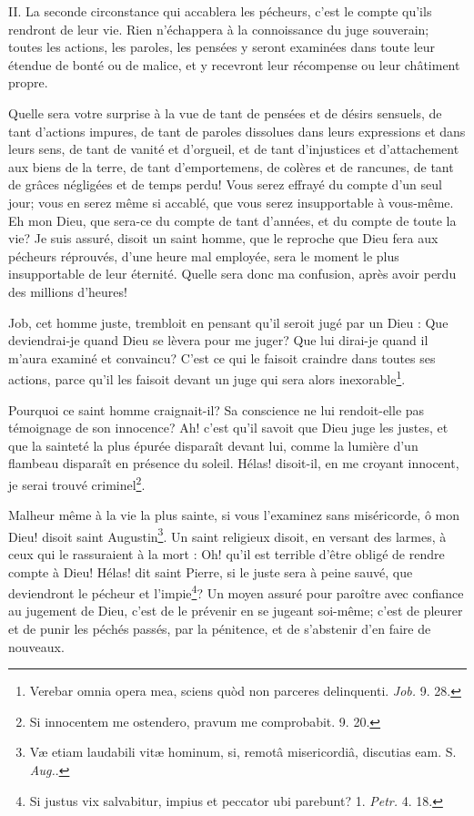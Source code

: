 \documentclass[instructions.tex]{subfiles}
\begin{document}
II. La seconde circonstance qui accablera les pécheurs, c'est le compte qu'ils rendront de leur vie. Rien n'échappera à la connoissance du juge souverain; toutes les actions, les paroles, les pensées y seront examinées dans toute leur étendue de bonté ou de malice, et y recevront leur récompense ou leur châtiment propre.
 
Quelle sera votre surprise à la vue de tant de pensées et de désirs sensuels, de tant d'actions impures, de tant de paroles dissolues dans leurs expressions et dans leurs sens, de tant de vanité et d'orgueil, et de tant d'injustices et d'attachement aux biens de la terre, de tant d'emportemens, de colères et de rancunes, de tant de grâces négligées et de temps perdu! Vous serez effrayé du compte d'un seul jour; vous en serez même si accablé, que vous serez insupportable à vous-même. Eh mon Dieu, que sera-ce du compte de tant d'années, et du compte de toute la vie? Je suis assuré, disoit un saint homme, que le reproche que Dieu fera aux pécheurs réprouvés, d'une heure mal employée, sera le moment le plus insupportable de leur éternité. Quelle sera donc ma confusion, après avoir perdu des millions d'heures!
 
Job, cet homme juste, trembloit en pensant qu'il seroit jugé par un Dieu : Que deviendrai-je quand Dieu se lèvera pour me juger? Que lui dirai-je quand il m'aura examiné et convaincu? C'est ce qui le faisoit craindre dans toutes ses actions, parce qu'il les faisoit devant un juge qui sera alors inexorable\footnote{Verebar omnia opera mea, sciens quòd non parceres delinquenti. \textit{Job.} 9. 28.}.
 
Pourquoi ce saint homme craignait-il? Sa conscience ne lui rendoit-elle pas témoignage de son innocence? Ah! c'est qu'il savoit que Dieu juge les justes, et que la sainteté la plus épurée disparaît devant lui, comme la lumière d'un flambeau disparaît en présence du soleil. Hélas! disoit-il, en me croyant innocent, je serai trouvé criminel\footnote{Si innocentem me ostendero, pravum me comprobabit. 9. 20.}.
 
Malheur même à la vie la plus sainte, si vous l'examinez sans miséricorde, ô mon Dieu! disoit saint Augustin\footnote{Væ etiam laudabili vitæ hominum, si, remotâ misericordiâ, discutias eam. S. \textit{Aug.}.}. Un saint religieux disoit, en versant des larmes, à ceux qui le rassuraient à la mort : Oh! qu'il est terrible d'être obligé de rendre compte à Dieu! Hélas! dit saint Pierre, si le juste sera à peine sauvé, que deviendront le pécheur et l'impie\footnote{Si justus vix salvabitur, impius et peccator ubi parebunt? 1. \textit{Petr.} 4. 18.}? Un moyen assuré pour paroître avec confiance au jugement de Dieu, c'est de le prévenir en se jugeant soi-même; c'est de pleurer et de punir les péchés passés, par la pénitence, et de s'abstenir d'en faire de nouveaux.
 
\end{document}

